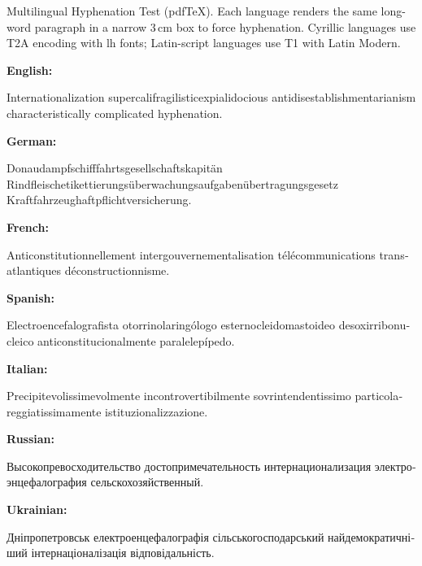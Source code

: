\documentclass[12pt,a4paper,oneside]{article}
\newcommand{\hyphtest}[3]{%
  \par\noindent\textbf{#1:}\par
  \begin{minipage}{3cm}\RaggedRight\foreignlanguage{#2}{#3}\end{minipage}\par
}
\begin{document}
Multilingual Hyphenation Test (pdfTeX). Each language renders the same long-word paragraph in a narrow 3\,cm box to force hyphenation. Cyrillic languages use T2A encoding with lh fonts; Latin-script languages use T1 with Latin Modern.
\hyphtest{English}{english}{Internationalization supercalifragilisticexpialidocious antidisestablishmentarianism characteristically complicated hyphenation.}
\hyphtest{German}{german}{Donaudampfschifffahrtsgesellschaftskapit\"an Rindfleischetikettierungs\"uberwachungsaufgaben\"ubertragungsgesetz Kraftfahrzeughaftpflichtversicherung.}
\hyphtest{French}{french}{Anticonstitutionnellement intergouvernementalisation t\'el\'ecommunications transatlantiques d\'econstructionnisme.}
\hyphtest{Spanish}{spanish}{Electroencefalografista otorrinolaring\'ologo esternocleidomastoideo desoxirribonucleico anticonstitucionalmente paralelep\'ipedo.}
\hyphtest{Italian}{italian}{Precipitevolissimevolmente incontrovertibilmente sovrintendentissimo particolareggiatissimamente istituzionalizzazione.}
\hyphtest{Russian}{russian}{Высокопревосходительство достопримечательность интернационализация электроэнцефалография сельскохозяйственный.}
\hyphtest{Ukrainian}{ukrainian}{Дніпропетровськ електроенцефалографія сільськогосподарський найдемократичніший інтернаціоналізація відповідальність.}
\end{document}
